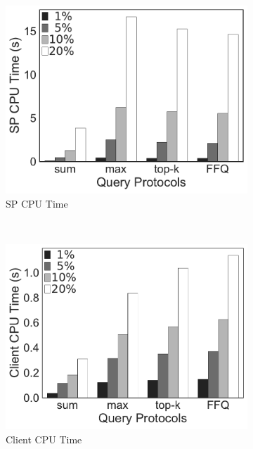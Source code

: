 \begin{figure}[t]
  \centering
  \begin{subfigure}[b]{.31\linewidth}
    \centering
    \includegraphics[width=\linewidth]{exp-figs/aggregate-queries/pgp_sp.pdf}
    \caption{SP CPU Time}
  \end{subfigure}~%
  \begin{subfigure}[b]{.31\linewidth}
    \centering
    \includegraphics[width=\linewidth]{exp-figs/aggregate-queries/pgp_client.pdf}
    \caption{Client CPU Time}
  \end{subfigure}~%
  \begin{subfigure}[b]{.36\linewidth}
    \centering

\end{subfigure}
\end{figure}
